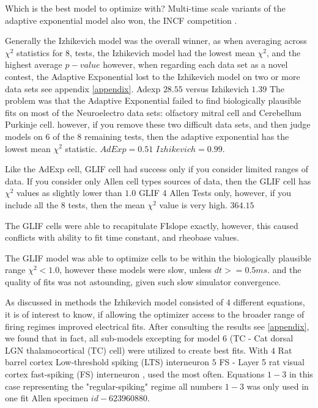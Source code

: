 Which is the best model to optimize with?
Multi-time scale variants of the adaptive exponential model also won, the INCF competition \cite{incf_multi}.

Generally the Izhikevich model was the overall winner, as when averaging across $\chi^{2}$ statistics for 8, tests, the Izhikevich model had the lowest mean $\chi^{2}$, and the highest average $p-value$ however, when regarding each data set as a novel contest, the Adaptive Exponential lost to the Izhikevich model on two or more data sets see appendix \ref{appendix}.
Adexp $28.55$ versus 
Izhikevich $1.39$
The problem was that the Adaptive Exponential failed to find biologically plausible fits on most of the Neuroelectro data sets: olfactory mitral cell and Cerebellum Purkinje cell. however, if you remove these two difficult data sets, and then judge models on 6 of the 8 remaining tests, then the adaptive exponential has the lowest mean $\chi^{2}$ statistic. $AdExp=0.51$	$Izhikevich=0.99$.

Like the AdExp cell, GLIF cell had success only if you consider limited ranges of data. If you consider only Allen cell types sources of data, then the GLIF cell has $\chi^{2}$ values as slightly lower than $1.0$ GLIF 4 Allen Tests only, however, if you include all the 8 tests, then the mean $\chi^{2}$ value is very high. $364.15$

The GLIF cells were able to recapitulate FIslope exactly, however, this caused conflicts with ability to fit time constant, and rheobase values.

The GLIF model was able to optimize cells to be within the biologically plausible range $\chi^{2}<1.0$, however these models were slow, unless $dt>=0.5ms$. and the quality of fits was not astounding, given such slow simulator convergence.

As discussed in methods the Izhikevich model consisted of $4$ different equations, it is of interest to know, if allowing the optimizer access to the broader range of firing regimes improved electrical fits. After consulting the results see \ref{appendix}, we found that in fact, all sub-models excepting for model $6$ (TC - Cat dorsal LGN thalamocortical (TC) cell) were utilized to create best fits. With $4$ Rat barrel cortex Low-threshold  spiking (LTS) interneuron 
$5$ FS - Layer 5 rat visual cortex fast-spiking (FS) interneuron , used the most often. Equations $1-3$ in this case representing the "regular-spiking" regime all numbers $1-3$ was only used in one fit Allen specimen $id-623960880$.


